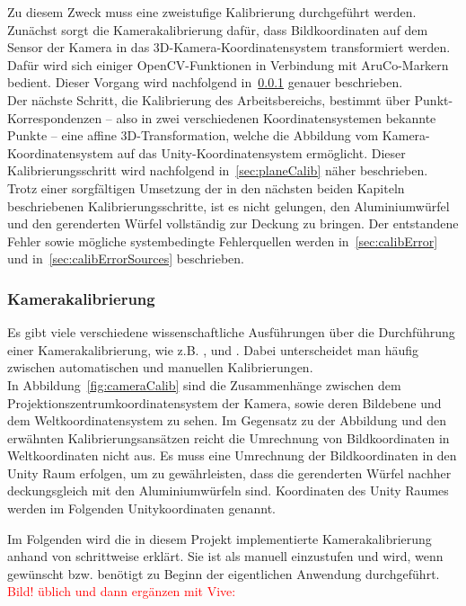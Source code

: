 Zu diesem Zweck muss eine zweistufige Kalibrierung durchgeführt werden. Zunächst sorgt die Kamerakalibrierung dafür, dass Bildkoordinaten auf dem Sensor der Kamera in das 3D-Kamera-Koordinatensystem transformiert werden. Dafür wird sich einiger OpenCV-Funktionen in Verbindung mit AruCo-Markern bedient. Dieser Vorgang wird nachfolgend in~\ref{sec:camCalib} genauer beschrieben.\\
Der nächste Schritt, die Kalibrierung des Arbeitsbereichs, bestimmt über Punkt-Korrespondenzen -- also in zwei verschiedenen Koordinatensystemen bekannte Punkte -- eine affine 3D-Transformation, welche die Abbildung vom Kamera-Koordinaten\-system auf das Unity-Koordinatensystem ermöglicht. Dieser Kalibrierungsschritt wird nachfolgend in~\ref{sec:planeCalib} näher beschrieben.\\
Trotz einer sorgfältigen Umsetzung der in den nächsten beiden Kapiteln beschriebenen Kalibrierungsschritte, ist es nicht gelungen, den Aluminiumwürfel und den gerenderten Würfel vollständig zur Deckung zu bringen. Der entstandene Fehler sowie mögliche systembedingte Fehlerquellen werden in~\ref{sec:calibError} und in~\ref{sec:calibErrorSources} beschrieben. 

\subsubsection{Kamerakalibrierung}\label{sec:camCalib}

Es gibt viele verschiedene wissenschaftliche Ausführungen über die Durchführung einer Kamerakalibrierung, wie z.B. \cite{5982395}, \cite{888718} und \cite{faugeras1993three}. Dabei unterscheidet man häufig zwischen automatischen und manuellen Kalibrierungen. \\
In Abbildung~\ref{fig:cameraCalib} sind die Zusammenhänge zwischen dem Projektionszentrumkoordinatensystem der Kamera, sowie deren Bildebene und dem Weltkoordinatensystem zu sehen. Im Gegensatz zu der Abbildung und den erwähnten Kalibrierungsansätzen reicht die Umrechnung von Bildkoordinaten in Weltkoordinaten nicht aus. Es muss eine Umrechnung der Bildkoordinaten in den Unity Raum erfolgen, um zu gewährleisten, dass die gerenderten Würfel nachher deckungsgleich mit den Aluminiumwürfeln sind. Koordinaten des Unity Raumes werden im Folgenden Unitykoordinaten genannt.





Im Folgenden wird die in diesem Projekt implementierte Kamerakalibrierung anhand von \cite{Meisel:77890} schrittweise erklärt. Sie ist als manuell einzustufen und wird, wenn gewünscht bzw. benötigt zu Beginn der eigentlichen Anwendung durchgeführt. \textcolor{red}{Bild! üblich und dann ergänzen mit Vive:}




